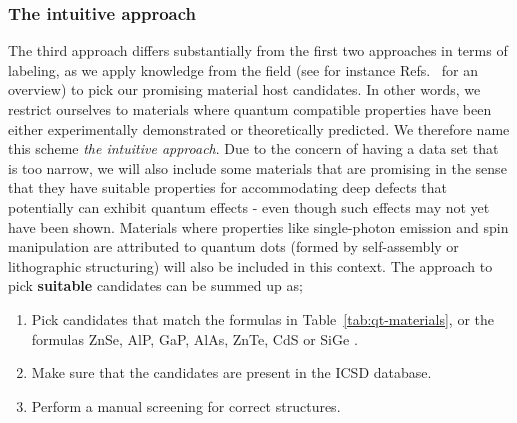 \documentclass[superscriptaddress,unsortedaddress,
 amsmath,amssymb,
 aps,
]{revtex4-2}
\begin{document}
\subsubsection*{The intuitive approach}
The third approach differs substantially from the first two approaches in terms of labeling, as we apply knowledge from the field (see for instance Refs.~\cite{Atatuere2018,Zhang2020,Son2020,Toth2019,Bathen2021} for an overview) to pick our promising material host candidates. 
In other words, we restrict ourselves to materials where quantum compatible properties have been either experimentally demonstrated or theoretically predicted. 
We therefore name this scheme \emph{the intuitive approach}. Due to the concern of having a data set that is too narrow, we will also include some  materials that are promising in the sense that they have suitable properties for accommodating  deep defects that potentially can exhibit quantum effects - even though such effects may not yet have been shown. 
Materials where properties like single-photon emission and spin manipulation are attributed to quantum dots (formed by self-assembly or lithographic structuring) will also be included in this context.  
The approach to pick \textbf{suitable} candidates can be summed up as;   
\begin{enumerate}
    \item Pick candidates that match the formulas in Table~\ref{tab:qt-materials}, or the formulas ZnSe, AlP, GaP, AlAs, ZnTe, CdS \cite{Weber2010} or SiGe \cite{Hardy2019}. 
    \item Make sure that the candidates are present in the ICSD database.  
    \item Perform a manual screening for correct structures. 
\end{enumerate}
\end{document}
